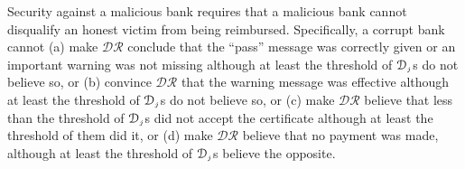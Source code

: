 

%
Security against a malicious bank requires that a malicious bank cannot disqualify an honest victim from being reimbursed. 
%
Specifically,  a corrupt bank cannot  (a) make $\mathcal{DR}$ conclude that the  ``pass'' message was correctly given or an important warning was not missing although at least the threshold of $\mathcal{D}_{\scriptscriptstyle j}$s  do not believe so, or (b) convince $\mathcal{DR}$  that the warning message was effective although at least the threshold of $\mathcal{D}_{\scriptscriptstyle j}$s do not believe so, or (c) make $\mathcal{DR}$ believe that less than the threshold of $\mathcal{D}_{\scriptscriptstyle j}$s did not accept the certificate although at least the threshold of them did it, or (d) make $\mathcal{DR}$ believe that no payment was made, although at least the threshold of $\mathcal{D}_{\scriptscriptstyle j}$s believe the opposite. 

